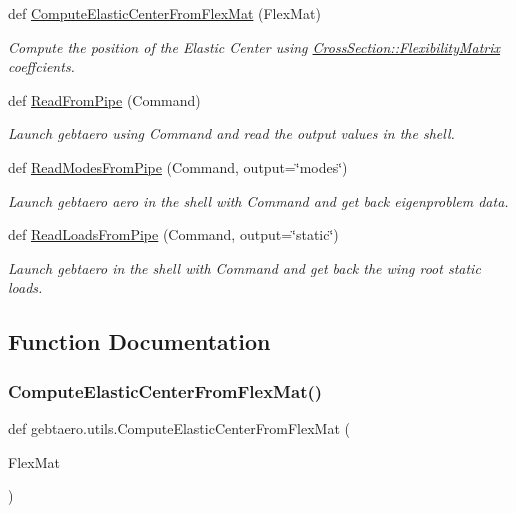 \begin{DoxyCompactItemize}
def \hyperlink{namespacegebtaero_1_1utils_ac3a921856ec921436caee59af0838d06}{Compute\+Elastic\+Center\+From\+Flex\+Mat} (Flex\+Mat)
\begin{DoxyCompactList}\small\item\em Compute the position of the Elastic Center using \hyperlink{classgebtaero_1_1_cross_section_1_1_cross_section_ac20eafaf38ff757f9a8c9ae89212396a}{Cross\+Section\+::\+Flexibility\+Matrix} coeffcients. \end{DoxyCompactList}\item 
def \hyperlink{namespacegebtaero_1_1utils_ad35c5461b34c42fdf3fb6abb8c21a46d}{Read\+From\+Pipe} (Command)
\begin{DoxyCompactList}\small\item\em Launch gebtaero using Command and read the output values in the shell. \end{DoxyCompactList}\item 
def \hyperlink{namespacegebtaero_1_1utils_a79bf2fa9cdad677abf70cacde7abcf9e}{Read\+Modes\+From\+Pipe} (Command, output=\char`\"{}modes\char`\"{})
\begin{DoxyCompactList}\small\item\em Launch gebtaero aero in the shell with Command and get back eigenproblem data. \end{DoxyCompactList}\item 
def \hyperlink{namespacegebtaero_1_1utils_ad2812937cff40c12f0af963ab0b429b6}{Read\+Loads\+From\+Pipe} (Command, output=\char`\"{}static\char`\"{})
\begin{DoxyCompactList}\small\item\em Launch gebtaero in the shell with Command and get back the wing root static loads. \end{DoxyCompactList}\end{DoxyCompactItemize}


\subsection{Function Documentation}
\mbox{\label{namespacegebtaero_1_1utils_ac3a921856ec921436caee59af0838d06}} 
\subsubsection{\texorpdfstring{Compute\+Elastic\+Center\+From\+Flex\+Mat()}{ComputeElasticCenterFromFlexMat()}}
{\footnotesize\ttfamily def gebtaero.\+utils.\+Compute\+Elastic\+Center\+From\+Flex\+Mat (\begin{DoxyParamCaption}\item[{}]{Flex\+Mat }\end{DoxyParamCaption})}



